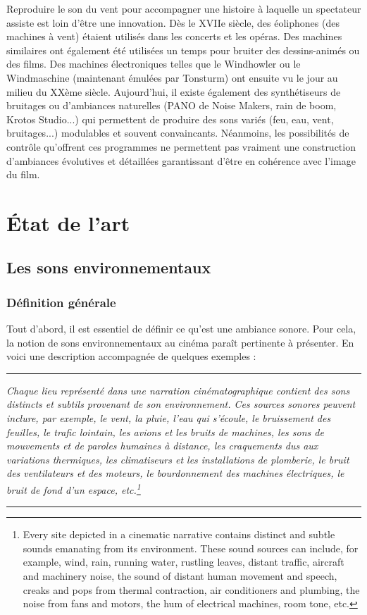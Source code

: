 ﻿\documentclass[12pt]{article}
\newcommand{\citationpropre}[3]{
\vspace{1.7em}
\hrule
\vspace{0.8em}

\textit{#1}

\hfill \parencite[#2]{#3}

\vspace{0.6em}
\hrule
\vspace{1.7em}
}
\begin{document}
Reproduire le son du vent pour accompagner une histoire à laquelle un spectateur assiste est loin d’être une innovation. Dès le XVIIe siècle, des éoliphones (des machines à vent) étaient utilisés dans les concerts et les opéras. Des machines similaires ont également été utilisées un temps pour bruiter des dessins-animés ou des films. Des machines électroniques telles que le Windhowler ou le Windmaschine (maintenant émulées par Tonsturm) ont ensuite vu le jour au milieu du XXème siècle. Aujourd'hui, il existe également des synthétiseurs de bruitages ou d'ambiances naturelles (PANO de Noise Makers, rain de boom, Krotos Studio...) qui permettent de produire des sons variés (feu, eau, vent, bruitages...) modulables et souvent convaincants. Néanmoins, les possibilités de contrôle qu'offrent ces programmes ne permettent pas vraiment une construction d'ambiances évolutives et détaillées garantissant d'être en cohérence avec l'image du film.

\newpage

\section{État de l’art}

\subsection{Les sons environnementaux}

\subsubsection{Définition générale}

Tout d'abord, il est essentiel de définir ce qu'est une ambiance sonore. Pour cela, la notion de sons environnementaux au cinéma paraît pertinente à présenter. En voici une description accompagnée de quelques exemples : 

\citationpropre{Chaque lieu représenté dans une narration cinématographique contient des sons distincts et subtils provenant de son environnement. Ces sources sonores peuvent inclure, par exemple, le vent, la pluie, l'eau qui s'écoule, le bruissement des feuilles, le trafic lointain, les avions et les bruits de machines, les sons de mouvements et de paroles humaines à distance, les craquements dus aux variations thermiques, les climatiseurs et les installations de plomberie, le bruit des ventilateurs et des moteurs, le bourdonnement des machines électriques, le bruit de fond d'un espace, etc.\footnote{Every site depicted in a cinematic narrative contains distinct and subtle sounds emanating from its environment. These sound sources can include, for example, wind, rain, running water, rustling leaves, distant traffic, aircraft and machinery noise, the sound of distant human movement and speech, creaks and pops from thermal contraction, air conditioners and plumbing, the noise from fans and motors, the hum of electrical machines, room tone, etc.} }{p.~14}{chattopadhyay_auditory_2021}
\end{document}
